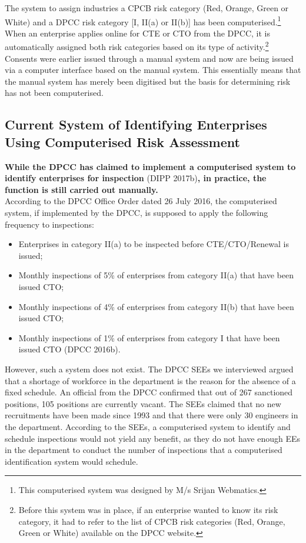 \documentclass[a4paper, 12pt]{article}
\begin{document}
                 
                 The system to assign industries a CPCB risk category (Red, Orange, Green or White) and a DPCC risk category [I, II(a) or II(b)] has been computerised.\footnote{This computerised system was designed by M/s Srijan Webmatics.} When an enterprise applies online for CTE or CTO from the DPCC, it is automatically assigned both risk categories based on its type of activity.\footnote{Before this system was in place, if an enterprise wanted to know its risk category, it had to refer to the list of CPCB risk categories (Red, Orange, Green or White) available on the DPCC website.} Consents were earlier issued through a manual system and now are being issued via a computer interface based on the manual system. This essentially means that the manual system has merely been digitised but the basis for determining risk has not been computerised. \\

	\subsection{Current System of Identifying Enterprises Using Computerised Risk Assessment}
	
	\textbf{While the DPCC has claimed to implement a computerised system to identify enterprises for inspection} (DIPP 2017b)\textbf{, in practice, the function is still carried out manually.} \\
	
	According to the DPCC Office Order dated 26 July 2016, the computerised system, if implemented by the DPCC, is supposed to apply the following frequency to inspections: \\
	
	\begin{itemize}
	\item{Enterprises in category II(a) to be inspected before CTE/CTO/Renewal is issued;}
	\item{Monthly inspections of 5\% of enterprises from category II(a) that have been issued CTO;}
	\item{Monthly inspections of 4\% of enterprises from category II(b) that have been issued CTO;}
	\item{Monthly inspections of 1\% of enterprises from category I that have been issued CTO (DPCC 2016b).}
	\end{itemize} 
	
	However, such a system does not exist. The DPCC SEEs we interviewed argued that a shortage of workforce in the department is the reason for the absence of a fixed schedule. An official from the DPCC confirmed that out of 267 sanctioned positions, 105 positions are currently vacant. The SEEs claimed that no new recruitments have been made since 1993 and that there were only 30 engineers in the department. According to the SEEs, a computerised system to identify and schedule inspections would not yield any benefit, as they do not have enough EEs in the department to conduct the number of inspections that a computerised identification system would schedule. \\
	
\end{document}
